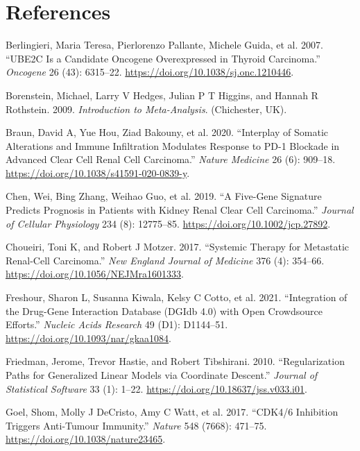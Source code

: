 \documentclass[
  12pt,
]{article}
\newlength{\cslhangindent}
\newenvironment{CSLReferences}[2] %
 {\begin{list}{}{%
  \setlength{\itemindent}{0pt}
  \setlength{\leftmargin}{0pt}
  \setlength{\parsep}{0pt}
  \ifodd #1
   \setlength{\leftmargin}{\cslhangindent}
   \setlength{\itemindent}{-1\cslhangindent}
  \fi
  \setlength{\itemsep}{#2\baselineskip}}}
 {\end{list}}
\begin{document}
\section{References}\label{references}

\protect{}\label{refs}
\begin{CSLReferences}{1}{1}
Berlingieri, Maria Teresa, Pierlorenzo Pallante, Michele Guida, et al.
2007. {``{UBE2C} Is a Candidate Oncogene Overexpressed in Thyroid
Carcinoma.''} \emph{Oncogene} 26 (43): 6315--22.
\url{https://doi.org/10.1038/sj.onc.1210446}.

Borenstein, Michael, Larry V Hedges, Julian P T Higgins, and Hannah R
Rothstein. 2009. \emph{Introduction to Meta-Analysis}. (Chichester, UK).

Braun, David A, Yue Hou, Ziad Bakouny, et al. 2020. {``Interplay of
Somatic Alterations and Immune Infiltration Modulates Response to {PD-1}
Blockade in Advanced Clear Cell Renal Cell Carcinoma.''} \emph{Nature
Medicine} 26 (6): 909--18.
\url{https://doi.org/10.1038/s41591-020-0839-y}.

Chen, Wei, Bing Zhang, Weihao Guo, et al. 2019. {``A Five-Gene Signature
Predicts Prognosis in Patients with Kidney Renal Clear Cell
Carcinoma.''} \emph{Journal of Cellular Physiology} 234 (8): 12775--85.
\url{https://doi.org/10.1002/jcp.27892}.

Choueiri, Toni K, and Robert J Motzer. 2017. {``Systemic Therapy for
Metastatic Renal-Cell Carcinoma.''} \emph{New England Journal of
Medicine} 376 (4): 354--66. \url{https://doi.org/10.1056/NEJMra1601333}.

Freshour, Sharon L, Susanna Kiwala, Kelsy C Cotto, et al. 2021.
{``Integration of the Drug-Gene Interaction Database ({DGIdb} 4.0) with
Open Crowdsource Efforts.''} \emph{Nucleic Acids Research} 49 (D1):
D1144--51. \url{https://doi.org/10.1093/nar/gkaa1084}.

Friedman, Jerome, Trevor Hastie, and Robert Tibshirani. 2010.
{``Regularization Paths for Generalized Linear Models via Coordinate
Descent.''} \emph{Journal of Statistical Software} 33 (1): 1--22.
\url{https://doi.org/10.18637/jss.v033.i01}.

Goel, Shom, Molly J DeCristo, Amy C Watt, et al. 2017. {``{CDK4/6}
Inhibition Triggers Anti-Tumour Immunity.''} \emph{Nature} 548 (7668):
471--75. \url{https://doi.org/10.1038/nature23465}.


\end{CSLReferences}
\end{document}
